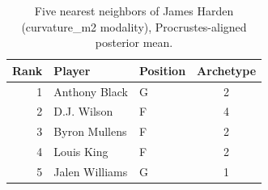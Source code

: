 \begin{table}[htbp]
  \centering\small
  \begin{tabular}{rllc}
    \toprule
    Rank & Player & Position & Archetype \\
    \midrule
    1 & Anthony Black & G & 2 \\
    2 & D.J. Wilson & F & 4 \\
    3 & Byron Mullens & F & 2 \\
    4 & Louis King & F & 2 \\
    5 & Jalen Williams & G & 1 \\
    \bottomrule
  \end{tabular}
  \caption{Five nearest neighbors of James Harden (curvature_m2 modality), Procrustes-aligned posterior mean.}
  \label{tab:James_Harden_neighbors_curvature_m2}
\end{table}


